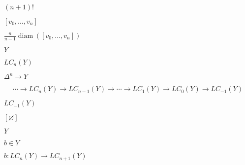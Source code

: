 \documentclass[10pt]{book}
\begin{document}
\begin{mdSnippets}
\begin{mdInlineSnippet}[00178f10a40e91f76517d52061ef2a42]
$(n+1)!$\end{mdInlineSnippet}%
\begin{mdInlineSnippet}%
$[v_0, \dots, v_n]$\end{mdInlineSnippet}%
\begin{mdInlineSnippet}[ef00f9fcebe0f6012699dd160f2d9f49]%
$\frac{n}{n-1} \operatorname{diam}([v_0, \dots, v_n])$\end{mdInlineSnippet}%
\begin{mdInlineSnippet}[57cec4137b614c87cb4e24a3d003a3e0]%
$Y$\end{mdInlineSnippet}%
\begin{mdInlineSnippet}[f88d6e8fb0d43e67829847c05d29df9f]%
$LC_n(Y)$\end{mdInlineSnippet}%
\begin{mdInlineSnippet}[78f60b2b7159898a4508a64a543798d0]%
$\Delta^n \to Y$\end{mdInlineSnippet}%
\begin{mdDisplaySnippet}%
\[%
\cdots \longrightarrow LC_n(Y)
\longrightarrow LC_{n-1}(Y)
\longrightarrow \cdots
\longrightarrow LC_{1}(Y)
\longrightarrow LC_{0}(Y)
\longrightarrow LC_{-1}(Y)
\]%
\end{mdDisplaySnippet}%
\begin{mdInlineSnippet}%
$LC_{-1}(Y)$\end{mdInlineSnippet}%
\begin{mdInlineSnippet}[fd012be125e1b23b6f2f07dad1d59753]%
$[\varnothing]$\end{mdInlineSnippet}%
\begin{mdInlineSnippet}[57cec4137b614c87cb4e24a3d003a3e0]%
$Y$\end{mdInlineSnippet}%
\begin{mdInlineSnippet}[59dc30afd8936ee6f368ab526269a31a]%
$b \in Y$\end{mdInlineSnippet}%
\begin{mdInlineSnippet}[07a77d5fe67690a5ab4a41f56cdcc0db]%
$b: LC_n(Y) \to LC_{n+1}(Y)$\end{mdInlineSnippet}%
\begin{mdDisplaySnippet}[0f7a75a86de249eb8a3c2a01774ff521]%

\end{mdDisplaySnippet}
\end{mdSnippets}
\end{document}
